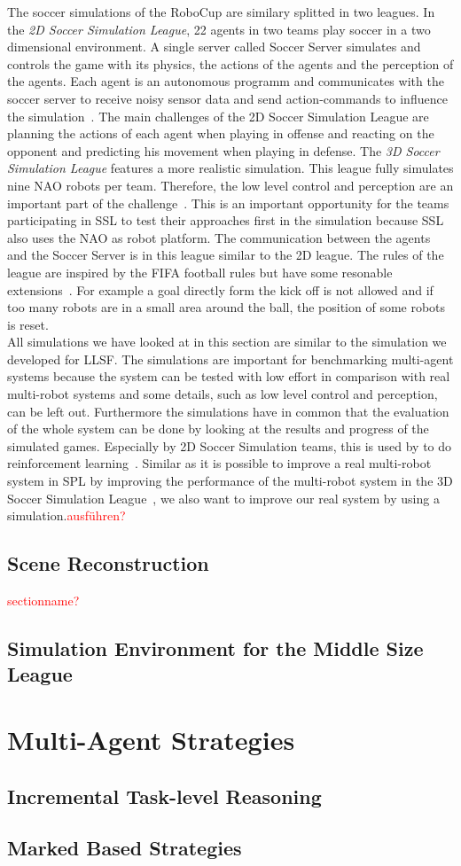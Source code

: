 The soccer simulations of the RoboCup are similary splitted in two leagues. In the \textit{2D Soccer Simulation League}, 22 agents in two teams play soccer in a two dimensional environment. A single server called Soccer Server simulates and controls the game with its physics, the actions of the agents and the perception of the agents. Each agent is an autonomous programm and communicates with the soccer server to receive noisy sensor data and send action-commands to influence the simulation~\cite{soccer_simulation}. The main challenges of the 2D Soccer Simulation League are planning the actions of each agent when playing in offense and reacting on the opponent and predicting his movement when playing in defense. The \textit{3D Soccer Simulation League} features a more realistic simulation. This league fully simulates nine NAO robots per team. Therefore, the low level control and perception are an important part of the challenge~\cite{soccer_simulation_low_level}. This is an important opportunity for the teams participating in SSL to test their approaches first in the simulation because SSL also uses the NAO as robot platform. The communication between the agents and the Soccer Server is in this league similar to the 2D league. The rules of the league are inspired by the FIFA football rules but have some resonable extensions~\cite{soccer_rules_3d}. For example a goal directly form the kick off is not allowed and if too many robots are in a small area around the ball, the position of some robots is reset.\\
All simulations we have looked at in this section are similar to the simulation we developed for LLSF. The simulations are important for benchmarking multi-agent systems because the system can be tested with low effort in comparison with real multi-robot systems and some details, such as low level control and perception, can be left out.  Furthermore the simulations have in common that the evaluation of the whole system can be done by looking at the results and progress of the simulated games. Especially by 2D Soccer Simulation teams, this is used by to do reinforcement learning~\cite{simsoccer_reinforcement_1,simsoccer_reinforcement_2}. Similar as it is possible to improve a real multi-robot system in SPL by improving the performance of the multi-robot system in the 3D Soccer Simulation League~\cite{from_sim_to_real}, we also want to improve our real system by using a simulation.\textcolor{red}{ausführen?}


\subsection{Scene Reconstruction}
\textcolor{red}{sectionname?}
\subsection{Simulation Environment for the Middle Size League}

\section{Multi-Agent Strategies}
\subsection{Incremental Task-level Reasoning}
\subsection{Marked Based Strategies}
